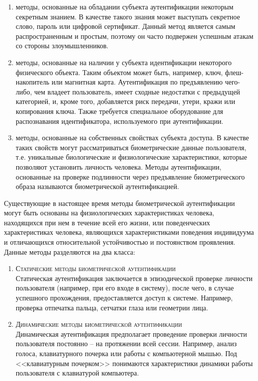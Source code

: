 \documentclass[12pt]{article}
\begin{document}
    \begin{enumerate}
        \item методы, основанные на обладании субъекта аутентификации некоторым секретным знанием. В качестве такого знания может выступать секретное слово, пароль или цифровой сертификат. Данный метод является самым распространенным и простым, поэтому он часто подвержен успешным атакам со стороны злоумышленников.

        \item методы, основанные на наличии у субъекта идентификации некоторого физического объекта. Таким объектом может быть, например, ключ, флеш-накопитель или магнитная карта. Аутентификация по предъявлению чего-либо, чем владеет пользователь, имеет сходные недостатки с предыдущей категорией, и, кроме того, добавляется риск передачи, утери, кражи или копирования ключа. Также требуется специальное оборудование для распознавания идентификатора, используемого при аутентификации.

        \item методы, основанные на собственных свойствах субъекта доступа. В качестве таких свойств могут рассматриваться биометрические данные пользователя, т.е. уникальные биологические и физиологические характеристики, которые позволяют установить личность человека. Методы аутентификации, основанные на проверке подлинности через предъявление биометрического образа называются биометрической аутентификацией.
    \end{enumerate}


    \par Существующие в настоящее время методы биометрической аутентификации могут быть основаны на физиологических характеристиках человека, находящихся при нем в течение всей его жизни, или поведенческих характеристиках человека, являющихся характеристиками поведения индивидуума и отличающихся относительной устойчивостью и постоянством проявления. Данные методы разделяются на два класса:

    \begin{enumerate}
        \item \textsc{Статические методы биометрической аутентификации} \\
        Статическая аутентификация заключается в эпизодической проверке личности пользователя (например, при его входе в систему), после чего, в случае успешного прохождения, предоставляется доступ к системе. Например, проверка отпечатка пальца, сетчатки глаза или геометрии лица.

        \item \textsc{Динамические методы биометрической аутентификации} \\
        Динамическая аутентификация предполагает проведение проверки личности пользователя постоянно -- на протяжении всей сессии. Например, анализ голоса, клавиатурного почерка или работы с компьютерной мышью. Под <<клавиатурным почерком>> понимаются характеристики динамики работы пользователя с клавиатурой компьютера.
    \end{enumerate}
\end{document}
